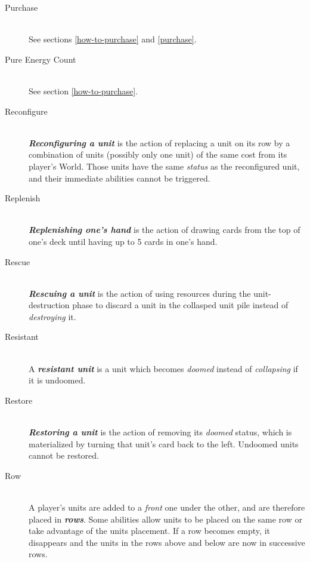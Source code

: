 \documentclass[a4paper]{article}
\begin{document}
\begin{description}
        \item[Purchase] \hfill \\
            See sections \ref{how-to-purchase} and \ref{purchase}.
            
        \item[Pure Energy Count] \hfill \\
            See section \ref{how-to-purchase}.
            
        \item[Reconfigure] \hfill \\
            \textbf{\textit{Reconfiguring a unit}} is the action of replacing a unit
            on its row by a combination of units (possibly only one unit)
            of the same cost from its player's World.
            Those units have the same \textit{status} as the reconfigured unit,
            and their immediate abilities cannot be triggered.
            
        \item[Replenish] \hfill \\
            \textbf{\textit{Replenishing one's hand}} is the action of drawing
            cards from the top of one's deck until having up to 5 cards in one's hand.
            
        \item[Rescue] \hfill \\
            \textbf{\textit{Rescuing a unit}} is the action of using resources
            during the unit-destruction phase to discard a unit in the collasped unit
            pile instead of \textit{destroying} it.
            
        \item[Resistant] \hfill \\
            A \textbf{\textit{resistant unit}} is a unit which becomes \textit{doomed}
            instead of \textit{collapsing} if it is undoomed.
            
        \item[Restore] \hfill \\
            \textbf{\textit{Restoring a unit}} is the action of removing
            its \textit{doomed} status, which is materialized by turning
            that unit's card back to the left.
            Undoomed units cannot be restored.
            
        \item[Row] \hfill \\
            A player's units are added to a \textit{front} one under the other,
            and are therefore placed in \textbf{\textit{rows}}.
            Some abilities allow units to be placed on the same row or
            take advantage of the units placement.
            If a row becomes empty, it disappears and the units in the rows
            above and below are now in successive rows.
            

\end{description}
\end{document}
